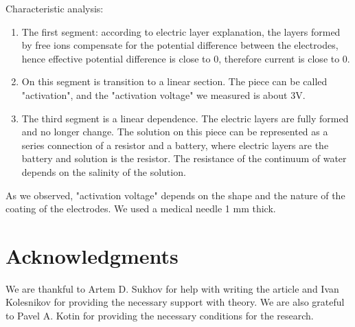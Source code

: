\documentclass{article}
\begin{document}
Characteristic analysis:
\begin{enumerate}   
\item The first segment: according to electric layer explanation, the layers formed by free ions compensate for the potential difference between the electrodes, hence effective potential difference is close to 0, therefore current is close to 0.

\item On this segment is transition to a linear section. The piece can be called "activation", and the "activation voltage" we measured is about 3V.

\item The third segment is a linear dependence. The electric layers are fully formed and no longer change. The solution on this piece can be represented as a series connection of a resistor and a battery, where electric layers are the battery and solution is the resistor. The resistance of the continuum of water depends on the salinity of the solution.
\end{enumerate}

As we observed, "activation voltage" depends on the shape and the nature of the coating of the electrodes. We used a medical needle 1 mm thick.



\section{Acknowledgments}
We are thankful to Artem D. Sukhov for help with writing the article and Ivan Kolesnikov for providing the necessary support with theory. We are also grateful to Pavel A. Kotin for providing the necessary conditions for the research.



\end{document}

